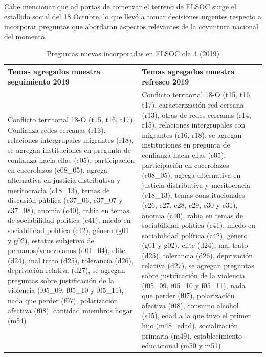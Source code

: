 \documentclass[
]{book}
\begin{document}
Cabe mencionar que ad portas de comenzar el terreno de ELSOC surge el estallido social del 18 Octubre, lo que llevó a tomar decisiones urgentes respecto a incorporar preguntas que abordaran aspectos relevantes de la coyuntura nacional del momento.

\begin{table}[H]

\caption{\label{tab:nuevotemas}\label{tab:difcuest}Preguntas nuevas incorporadas en ELSOC ola 4 (2019)}
\centering
\begin{tabular}[t]{>{\raggedright\arraybackslash}p{6cm}>{\raggedright\arraybackslash}p{6cm}}
\toprule
Temas agregados muestra seguimiento 2019 & Temas agregados muestra refresco 2019\\
\midrule
Conflicto territorial 18-O (t15, t16, t17), Confianza redes cercanas (r13), relaciones intergrupales migrantes (r18), se agregan instituciones en pregunta de confianza hacia ellas (c05), participación en cacerolazos (c08\_05), agrega alternativa en justicia distributiva y meritocracia (c18\_13), temas de discusión pública (c37\_06, c37\_07 y c37\_08), anomia (c40), rabia en temas de sociabilidad política (c41), miedo en sociabilidad política (c42), género (g01 y g02), estatus subjetivo de peruanos/venezolanos (d01\_04), elite (d24), mal trato (d25), tolerancia (d26), deprivación relativa (d27), se agregan preguntas sobre justificación de la violencia (f05\_09, f05\_10 y f05\_11), nada que perder (f07), polarización afectiva (f08), cantidad miembros hogar (m54) & Conflicto territorial 18-O (t15, t16, t17), caracterización red cercana (r13), otras de redes cercanas (r14, r15), relaciones intergrupales con migrantes (r16, r18), se agregan instituciones en pregunta de confianza hacia ellas (c05), participación en cacerolazos (c08\_05), agrega alternativa en justicia distributiva y meritocracia (c18\_13), temas constitucionales (c26, c27, c28, c29, c30 y c31), anomia (c40), rabia en temas de sociabilidad política (c41), miedo en sociabilidad política (c42), género (g01 y g02), elite (d24), mal trato (d25), tolerancia (d26), deprivación relativa (d27), se agregan preguntas sobre justificación de la violencia (f05\_09, f05\_10 y f05\_11), nada que perder (f07), polarización afectiva (f08), consumo alcohol (s15), edad a la que tuvo el primer hijo (m48\_edad), socialización primaria (m49), establecimiento educacional (m50 y m51)\\
\bottomrule
\end{tabular}
\end{table}
\end{document}
